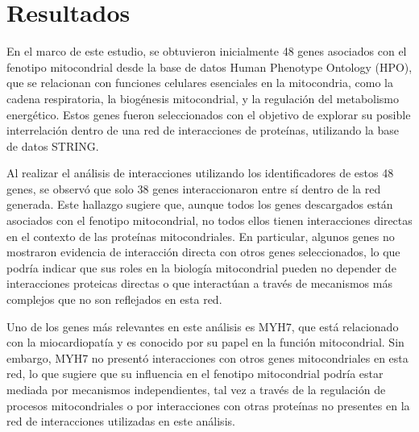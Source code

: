 
\section{Resultados}


En el marco de este estudio, se obtuvieron inicialmente 48 genes asociados con el fenotipo mitocondrial desde la base de datos Human Phenotype Ontology (HPO), que se relacionan con funciones celulares esenciales en la mitocondria, como la cadena respiratoria, la biogénesis mitocondrial, y la regulación del metabolismo energético. Estos genes fueron seleccionados con el objetivo de explorar su posible interrelación dentro de una red de interacciones de proteínas, utilizando la base de datos STRING.

Al realizar el análisis de interacciones utilizando los identificadores de estos 48 genes, se observó que solo 38 genes interaccionaron entre sí dentro de la red generada. Este hallazgo sugiere que, aunque todos los genes descargados están asociados con el fenotipo mitocondrial, no todos ellos tienen interacciones directas en el contexto de las proteínas mitocondriales. En particular, algunos genes no mostraron evidencia de interacción directa con otros genes seleccionados, lo que podría indicar que sus roles en la biología mitocondrial pueden no depender de interacciones proteicas directas o que interactúan a través de mecanismos más complejos que no son reflejados en esta red.

Uno de los genes más relevantes en este análisis es MYH7, que está relacionado con la miocardiopatía y es conocido por su papel en la función mitocondrial. Sin embargo, MYH7 no presentó interacciones con otros genes mitocondriales en esta red, lo que sugiere que su influencia en el fenotipo mitocondrial podría estar mediada por mecanismos independientes, tal vez a través de la regulación de procesos mitocondriales o por interacciones con otras proteínas no presentes en la red de interacciones utilizadas en este análisis.
